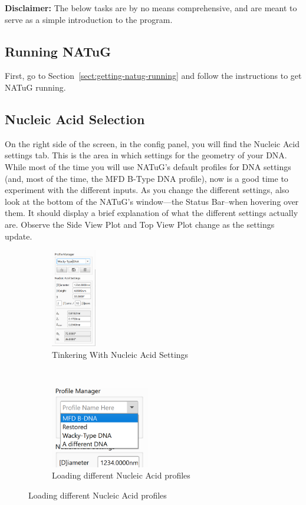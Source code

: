 \documentclass[titlepage]{article}
\begin{document}
\textbf{Disclaimer:} The below tasks are by no means comprehensive, and are meant to serve as a simple introduction to the program.

\subsection{Running NATuG}
First, go to Section~\ref{sect:getting-natug-running} and follow the instructions to get NATuG running.

\subsection{Nucleic Acid Selection}

On the right side of the screen, in the config panel, you will find the Nucleic Acid settings tab. This is the area in which settings for the geometry of your DNA. While most of the time you will use NATuG's default profiles for DNA settings (and, most of the time, the MFD B-Type DNA profile), now is a good time to experiment with the different inputs. As you change the different settings, also look at the bottom of the NATuG's window---the Status Bar--when hovering over them. It should display a brief explanation of what the different settings actually are. Observe the Side View Plot and Top View Plot change as the settings update.

\begin{figure}[h]
	\caption{Experimenting with Nucleic Acid settings}
	\centering
	\begin{subfigure}{.5\textwidth}
		\centering
		\includegraphics[height=1.7in]{nucleic-acid-tinkering.png}
		\caption{Tinkering With Nucleic Acid Settings}
	\end{subfigure}%
	~
	\begin{subfigure}{.5\textwidth}
		\centering
		\includegraphics[width=1.7in]{nucleic-acid-tinkering-2.png}
		\caption{Loading different Nucleic Acid profiles}
	\end{subfigure}
\end{figure}
	
\end{document}
